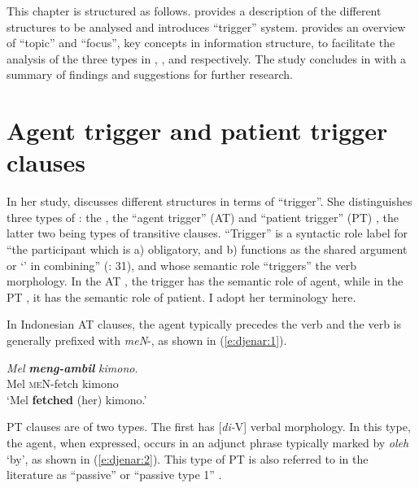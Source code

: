 \documentclass[output=paper
,modfonts
,nonflat]{langsci/langscibook}
\begin{document}
This chapter is structured as follows.  provides a description of the different  structures to be analysed and introduces  “trigger” system.  provides an overview of “topic” and “focus”, key concepts in information structure, to facilitate the analysis of the three   types in , , and  respectively. The study concludes in  with a summary of findings and suggestions for further research.

\section{\label{s:djenar:2}Agent trigger and patient trigger clauses}

In her study, \citet[29]{Cumming1991} discusses different  structures in terms of “trigger”. She distinguishes three types of : the , the “agent trigger” (AT)  and “patient trigger” (PT) , the latter two being types of transitive clauses. “Trigger” is a syntactic role label for “the participant which is a) obligatory, and b) functions as the shared argument or ‘’ in  combining” (\citeyear{Cumming1991}: 31), and whose semantic role “triggers” the verb morphology. In the AT , the trigger has the semantic role of agent, while in the PT , it has the semantic role of patient. I adopt her terminology here. 

In Indonesian AT clauses, the agent typically precedes the verb and the verb is generally prefixed with \textit{meN}-, as shown in (\ref{e:djenar:1}). 

\begin{exe}
	\ex\label{e:djenar:1}
	\gll \textit{Mel} \textbf{\textit{meng-ambil}} \textit{kimono}.\\
	Mel  \textsc{meN}-fetch  kimono\\	
	\glt ‘Mel \textbf{fetched} (her) kimono.’ \hfill\citep[14]{Nuranindya2009}
\end{exe}

\noindent
PT clauses are of two types. The first has [\textit{di-}V] verbal morphology. In this  type, the agent, when expressed, occurs in an adjunct phrase typically marked by \textit{oleh} ‘by’, as shown in (\ref{e:djenar:2}). This type of PT  is also referred to in the literature as “passive” or “passive type 1” \citep{SneddonEtAl2010}. 
\end{document}
